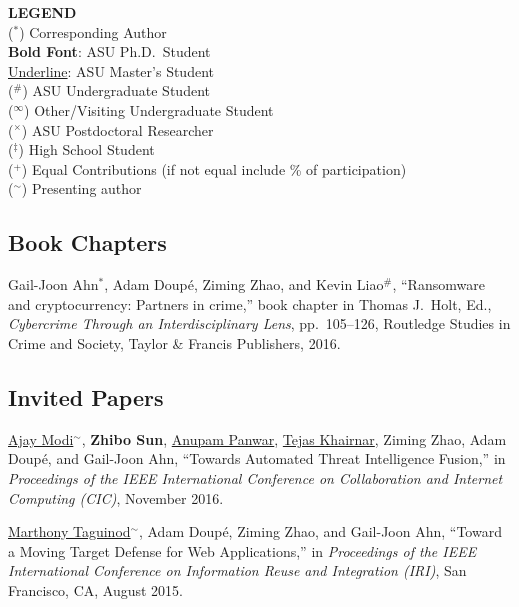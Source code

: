 \documentclass[11pt,letterpaper,sans]{moderncv}
\begin{document}
\begin{framed}
  \textbf{LEGEND} \\
  ($^*$) Corresponding Author \\
  \textbf{Bold Font}: ASU Ph.D.\ Student \\
  \underline{Underline}: ASU Master's Student \\
  ($^\#$) ASU Undergraduate Student \\
  ($^\infty$) Other/Visiting Undergraduate Student \\
  ($^\times$) ASU Postdoctoral Researcher \\
  ($^\ddagger$) High School Student \\
  ($^+$) Equal Contributions (if not equal include \% of participation) \\
  ($^\sim$) Presenting author \\
\end{framed}


\subsection{Book Chapters}

\begin{etaremune}

\item Gail-Joon Ahn$^*$, Adam Doup\'e, Ziming Zhao, and
  Kevin Liao$^\#$, ``Ransomware and cryptocurrency: Partners in
  crime,'' book chapter in Thomas J.\ Holt, Ed., \emph{Cybercrime
    Through an Interdisciplinary Lens}, pp.\ 105--126, Routledge
  Studies in Crime and Society, Taylor \& Francis Publishers, 2016.
  
\end{etaremune}

\subsection{Invited Papers}

\begin{etaremune}

\item \underline{Ajay Modi}$^{\sim}$, \textbf{Zhibo Sun}, \underline{Anupam
  Panwar}, \underline{Tejas Khairnar}, Ziming Zhao, Adam
  Doup\'e, and Gail-Joon Ahn, ``Towards Automated Threat Intelligence
  Fusion,'' in \emph{Proceedings of the IEEE International Conference
    on Collaboration and Internet Computing (CIC)}, November 2016.

\item \underline{Marthony Taguinod}$^{\sim}$, Adam Doup\'e, Ziming
  Zhao, and Gail-Joon Ahn, ``Toward a Moving Target Defense for Web
  Applications,'' in \emph{Proceedings of the IEEE International
    Conference on Information Reuse and Integration (IRI)}, San
  Francisco, CA, August 2015.
\end{etaremune}
\end{document}
